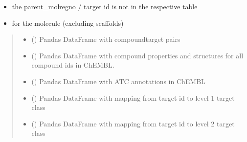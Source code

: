 \documentclass[letterpaper,10pt,english]{sphinxmanual}
\begin{document}
\begin{fulllineitems}
\begin{itemize}
\begin{description}
\end{description}

\item {} \begin{description}
\sphinxAtStartPar
the parent\_molregno / target id is not in the respective table

\end{description}

\item {} \begin{description}
\sphinxAtStartPar
for the molecule (excluding scaffolds)

\end{description}

\end{itemize}
\begin{quote}\begin{description}
\begin{itemize}
\item {} 
\sphinxAtStartPar
{} () \textendash{} Pandas DataFrame with compound\sphinxhyphen{}target pairs

\item {} 
\sphinxAtStartPar
{} () \textendash{} Pandas DataFrame with compound properties
and structures for all compound ids in ChEMBL.

\item {} 
\sphinxAtStartPar
{} () \textendash{} Pandas DataFrame with ATC annotations in ChEMBL

\item {} 
\sphinxAtStartPar
{} () \textendash{} Pandas DataFrame with mapping
from target id to level 1 target class

\item {} 
\sphinxAtStartPar
{} () \textendash{} Pandas DataFrame with mapping
from target id to level 2 target class


\end{itemize}
\end{description}
\end{quote}
\end{fulllineitems}
\end{document}
